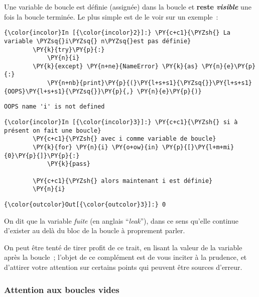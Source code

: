     Une variable de boucle est définie (assignée) dans la boucle et
\textbf{reste \emph{visible}} une fois la boucle terminée. Le plus
simple est de le voir sur un exemple~:

    \begin{Verbatim}[commandchars=\\\{\}]
{\color{incolor}In [{\color{incolor}2}]:} \PY{c+c1}{\PYZsh{} La variable \PYZsq{}i\PYZsq{} n\PYZsq{}est pas définie}
        \PY{k}{try}\PY{p}{:}
            \PY{n}{i}
        \PY{k}{except} \PY{n+ne}{NameError} \PY{k}{as} \PY{n}{e}\PY{p}{:}
            \PY{n+nb}{print}\PY{p}{(}\PY{l+s+s1}{\PYZsq{}}\PY{l+s+s1}{OOPS}\PY{l+s+s1}{\PYZsq{}}\PY{p}{,} \PY{n}{e}\PY{p}{)}
\end{Verbatim}


    \begin{Verbatim}[commandchars=\\\{\}]
OOPS name 'i' is not defined

    \end{Verbatim}

    \begin{Verbatim}[commandchars=\\\{\}]
{\color{incolor}In [{\color{incolor}3}]:} \PY{c+c1}{\PYZsh{} si à présent on fait une boucle}
        \PY{c+c1}{\PYZsh{} avec i comme variable de boucle}
        \PY{k}{for} \PY{n}{i} \PY{o+ow}{in} \PY{p}{[}\PY{l+m+mi}{0}\PY{p}{]}\PY{p}{:}
            \PY{k}{pass}
        
        \PY{c+c1}{\PYZsh{} alors maintenant i est définie}
        \PY{n}{i}
\end{Verbatim}


\begin{Verbatim}[commandchars=\\\{\}]
{\color{outcolor}Out[{\color{outcolor}3}]:} 0
\end{Verbatim}
            
    On dit que la variable \emph{fuite} (en anglais ``\emph{leak}''), dans
ce sens qu'elle continue d'exister au delà du bloc de la boucle à
proprement parler.

    On peut être tenté de tirer profit de ce trait, en lisant la valeur de
la variable après la boucle~; l'objet de ce complément est de vous
inciter à la prudence, et d'attirer votre attention sur certains points
qui peuvent être sources d'erreur.

    \hypertarget{attention-aux-boucles-vides}{%
\subsubsection{Attention aux boucles
vides}\label{attention-aux-boucles-vides}}

